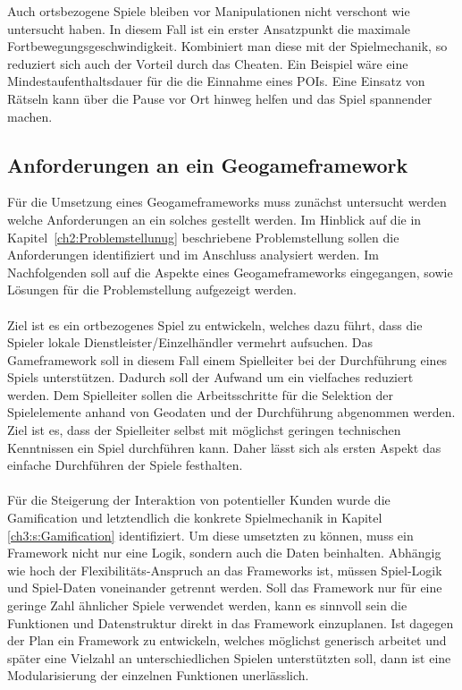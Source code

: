 Auch ortsbezogene Spiele bleiben vor Manipulationen nicht verschont wie \textcite{He.2011} untersucht haben.
In diesem Fall ist ein erster Ansatzpunkt die maximale Fortbewegungsgeschwindigkeit. Kombiniert man diese mit der Spielmechanik, so reduziert sich auch der \glqq Vorteil\grqq{} durch das Cheaten. Ein Beispiel wäre eine Mindestaufenthaltsdauer für die die Einnahme eines POIs.
Eine Einsatz von Rätseln kann über die Pause vor Ort hinweg helfen und das Spiel spannender machen.

\subsection*{Anforderungen an ein Geogameframework}

Für die Umsetzung eines Geogameframeworks muss zunächst untersucht werden welche Anforderungen an ein solches gestellt werden.
Im Hinblick auf die in Kapitel~\ref{ch2:Problemstellunug} beschriebene Problemstellung sollen die Anforderungen  identifiziert und im Anschluss analysiert werden.
Im Nachfolgenden soll auf die Aspekte eines Geogameframeworks eingegangen, sowie Lösungen für die Problemstellung aufgezeigt werden.
\\\\
Ziel ist es ein ortbezogenes Spiel zu entwickeln, welches dazu führt, dass die Spieler lokale Dienstleister/Einzelhändler vermehrt aufsuchen. Das Gameframework soll in diesem Fall einem Spielleiter bei der Durchführung eines Spiels unterstützen. Dadurch soll der Aufwand um ein vielfaches reduziert werden.
Dem Spielleiter sollen die Arbeitsschritte für die Selektion der Spielelemente anhand von Geodaten und der Durchführung abgenommen werden. Ziel ist es, dass der Spielleiter selbst mit möglichst geringen technischen Kenntnissen ein Spiel durchführen kann. Daher lässt sich als ersten Aspekt das einfache Durchführen der Spiele festhalten.
\\\\
Für die Steigerung der Interaktion von potentieller Kunden wurde die Gamification und letztendlich die konkrete Spielmechanik in Kapitel \ref{ch3:s:Gamification} identifiziert.
Um diese umsetzten zu können, muss ein Framework nicht nur eine Logik, sondern auch die Daten beinhalten. Abhängig wie hoch der Flexibilitäts-Anspruch an das Frameworks ist, müssen Spiel-Logik und Spiel-Daten voneinander getrennt werden. Soll das Framework nur für eine geringe Zahl ähnlicher Spiele verwendet werden, kann es sinnvoll sein die Funktionen und Datenstruktur direkt in das Framework einzuplanen. Ist dagegen der Plan ein Framework zu entwickeln, welches möglichst generisch arbeitet und später eine Vielzahl an unterschiedlichen Spielen unterstützten soll, dann ist eine Modularisierung der einzelnen Funktionen unerlässlich.
